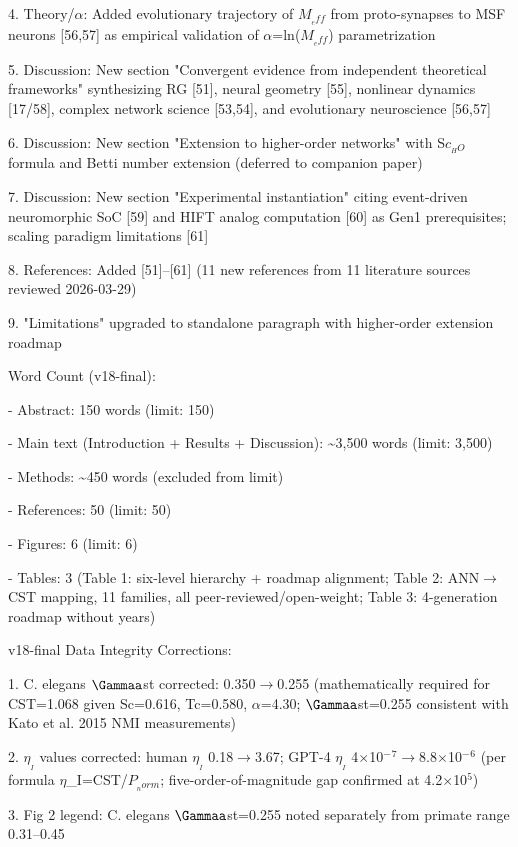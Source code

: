 \documentclass[a4paper,12pt]{article}
\begin{document}
4. Theory/$\alpha$: Added evolutionary trajectory of $M_{_eff}$ from proto-synapses to MSF neurons [56,57] as empirical validation of $\alpha$=ln($M_{_eff}$) parametrization

5. Discussion: New section "Convergent evidence from independent theoretical frameworks" synthesizing RG [51], neural geometry [55], nonlinear dynamics [17/58], complex network science [53,54], and evolutionary neuroscience [56,57]

6. Discussion: New section "Extension to higher-order networks" with S$c_{_HO}$ formula and Betti number extension (deferred to companion paper)

7. Discussion: New section "Experimental instantiation" citing event-driven neuromorphic SoC [59] and HIFT analog computation [60] as Gen1 prerequisites; scaling paradigm limitations [61]

8. References: Added [51]--[61] (11 new references from 11 literature sources reviewed 2026-03-29)

9. "Limitations" upgraded to standalone paragraph with higher-order extension roadmap

Word Count (v18-final):

- Abstract: 150 words \checkmark (limit: 150)

- Main text (Introduction + Results + Discussion): \textasciitilde{}3,500 words \checkmark (limit: 3,500)

- Methods: \textasciitilde{}450 words (excluded from limit)

- References: 50 \checkmark (limit: 50)

- Figures: 6 \checkmark (limit: 6)

- Tables: 3 (Table 1: six-level hierarchy + roadmap alignment; Table 2: ANN$\rightarrow$CST mapping, 11 families, all peer-reviewed/open-weight; Table 3: 4-generation roadmap without years)

v18-final Data Integrity Corrections:

1. C. elegans $\Gammaa$st corrected: 0.350$\rightarrow$0.255 (mathematically required for CST=1.068 given Sc=0.616, Tc=0.580, $\alpha$=4.30; $\Gammaa$st=0.255 consistent with Kato et al. 2015 NMI measurements)

2. $\eta_{_I}$ values corrected: human $\eta_{_I}$ 0.18$\rightarrow$3.67; GPT-4 $\eta_{_I}$ 4$\times$10$^{-}$$^7$$\rightarrow$8.8$\times$10$^{-}$$^6$ (per formula $\eta$_I=CST/$P_{_norm}$; five-order-of-magnitude gap confirmed at 4.2$\times$10$^5$)

3. Fig 2 legend: C. elegans $\Gammaa$st=0.255 noted separately from primate range 0.31--0.45
\end{document}
